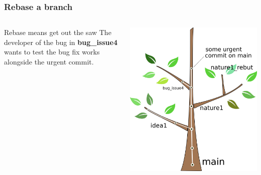 \documentclass{beamer}
\begin{document}
\begin{frame}
  \frametitle{Rebase a branch}
  \begin{columns}[T]
    \begin{column}{.5\textwidth}
      \begin{block}{Rebase means get out the saw}
        The developer of the bug in \textbf{bug\_issue4} wants to test the bug
        fix works alongside the urgent commit.
      \end{block}
    \end{column}
    \begin{column}{.5\textwidth}
      \includegraphics[width=\textwidth]{tree_rebase.png}
    \end{column}
  \end{columns}
\end{frame}
\end{document}

